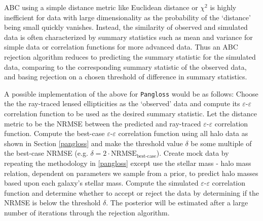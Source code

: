 \documentclass[%
 reprint,
 amsmath,amssymb,
 aps,nofootinbib
]{revtex4-1}
\begin{document}
ABC using a simple distance metric like Euclidean distance or $\chi^2$ is highly inefficient for data with large dimensionality as the probability of the `distance' being small quickly vanishes. Instead, the similarity of observed and simulated data is often characterized by summary statistics such as mean and variance for simple data or correlation functions for more advanced data. Thus an ABC rejection algorithm reduces to predicting the summary statistic for the simulated data, comparing to the corresponding summary statistic of the observed data, and basing rejection on a chosen threshold of difference in summary statistics.

A possible implementation of the above for \texttt{Pangloss} would be as follows: Choose the the ray-traced lensed ellipticities as the `observed' data and compute its $\varepsilon$-$\varepsilon$ correlation function to be used as the desired summary statistic. Let the distance metric to be the NRMSE between the predicted and ray-traced $\varepsilon$-$\varepsilon$ correlation function. Compute the best-case $\varepsilon$-$\varepsilon$ correlation function using all halo data as shown in Section \ref{pangloss} and make the threshold value $\delta$ be some multiple of the best-case NRMSE (e.g. ${\delta=2\cdot\text{NRMSE}_{\text{best-case}}}$). Create mock data by repeating the methodology in \ref{pangloss} except use the stellar mass - halo mass relation, dependent on parameters we sample from a prior, to predict halo masses based upon each galaxy's stellar mass. Compute the simulated $\varepsilon$-$\varepsilon$ correlation function and determine whether to accept or reject the data by determining if the NRMSE is below the threshold $\delta$. The posterior will be estimated after a large number of iterations through the rejection algorithm.

\end{document}
